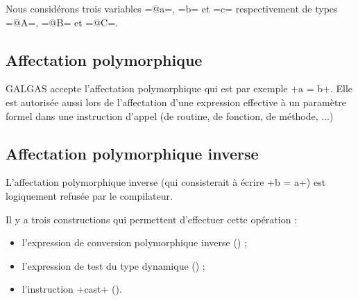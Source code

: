 Nous considérons trois variables \ggs=@a=, \ggs=b= et \ggs=c= respectivement de types \ggs=@A=, \ggs=@B= et \ggs=@C=.


\subsection{Affectation polymorphique}

GALGAS accepte l'affectation polymorphique qui est par exemple \ggs+a = b+. Elle est autorisée aussi lors de l'affectation d'une expression effective à un paramètre formel dans une instruction d'appel (de routine, de fonction, de méthode, ...)


\subsection{Affectation polymorphique inverse}

L'affectation polymorphique inverse (qui consisterait à écrire \ggs+b = a+) est logiquement refusée par le compilateur.

Il y a trois constructions qui permettent d'effectuer cette opération :
\begin{itemize}
  \item l'expression de conversion polymorphique inverse () ;
  \item l'expression de test du type dynamique () ;
  \item l'instruction \ggs+cast+ ().
\end{itemize}

%
%
%
%
%
%
%
%


